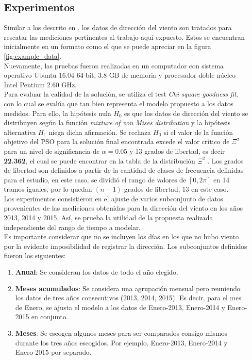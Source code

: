 \subsection{Experimentos}
Similar a los descrito en \label{sec:Experimentos_velocidad}, los datos de dirección del viento son tratados para rescatar las mediciones pertinentes al trabajo aquí expuesto. Estos se encuentran inicialmente en un formato como el que se puede apreciar en la figura \ref{fig:example_data}.\\
Nuevamente, las pruebas fueron realizadas en un computador con sistema operativo Ubuntu 16.04 64-bit, 3.8 GB de memoria y procesador doble núcleo Intel Pentium 2.60 GHz.\\
Para evaluar la calidad de la solución, se utiliza el test \emph{Chi square goodness fit}\cite{goodFitTest}, con lo cual se evalúa que tan bien representa el modelo propuesto a los datos medidos. Para ello, la hipótesis nula $H_0$ es que los datos de dirección del viento se distribuyen según la función \emph{mixture of von Mises distribution} y la hipótesis alternativa $H_1$ niega dicha afirmación. Se rechaza $H_0$ si el valor de la función objetivo del PSO para la solución final encontrada excede el valor crítico de $\Xi^2$ para un nivel de significancia de $\alpha = 0.05$ y 13 grados de libertad, es decir \textbf{22.362}, el cual se puede encontrar en la tabla de la distribución $\Xi^2$ \cite{chiSquareTable}. Los grados de libertad son definidos a partir de la cantidad de clases de frecuencia definidas para el estudio, en este caso, se dividió el rango de valores de $[0, 2\pi]$ en 14 tramos iguales, por lo quedan $(n-1)$ grados de libertad, 13 en este caso.\\
Los experimentos consistieron en el ajuste de varios subconjunto de datos provenientes de las mediciones obtenidas para la dirección del viento en los años 2013, 2014 y 2015. Así, se prueba la utilidad de la propuesta realizada independiente del rango de tiempo a modelar.\\
Es importante considerar que no se incluyen los días en los que no hubo viento por la evidente imposibilidad de registrar la dirección.
Los subconjuntos definidos fueron los siguientes:
\begin{enumerate}
    \item \textbf{Anual}: Se consideran los datos de todo el año elegido.
    \item \textbf{Meses acumulados}: Se considera una agrupación mensual pero reuniendo los datos de tres años consecutivos (2013, 2014, 2015). Es decir, para el mes de Enero, se ajusta el modelo a los datos de Enero-2013, Enero-2014 y Enero-2015 en conjunto.
    \item \textbf{Meses}: Se escogen algunos meses para ser comparados consigo mismos durante los tres años escogidos. Por ejemplo, Enero-2013, Enero-2014 y Enero-2015 por separado.       
\end{enumerate}

